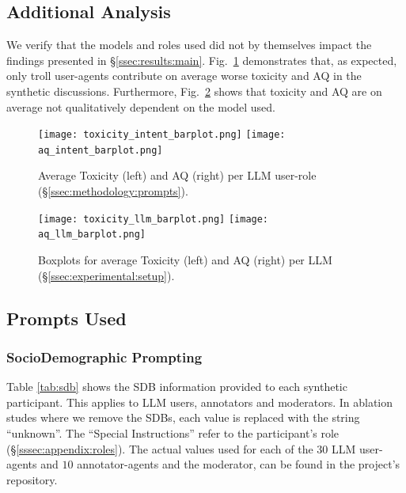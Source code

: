 \subsection{Additional Analysis}

We verify that the models and roles used did not by themselves impact the findings presented in \S\ref{ssec:results:main}. Fig.~\ref{fig:toxicity_aq_role} demonstrates that, as expected, only troll user-agents contribute on average worse toxicity and \ac{AQ} in the synthetic discussions. Furthermore, Fig.~\ref{fig:toxicity_aq_model} shows that toxicity and \ac{AQ} are on average not qualitatively dependent on the model used.

\begin{figure}
	\texttt{[image: toxicity\_intent\_barplot.png]} \hfill
	\texttt{[image: aq\_intent\_barplot.png]}
	\centering
	\caption{Average Toxicity (left) and \acf{AQ} (right) per \ac{LLM} user-role (\S\ref{ssec:methodology:prompts}).}
	\label{fig:toxicity_aq_role}
\end{figure}

\begin{figure}
	\texttt{[image: toxicity\_llm\_barplot.png]} \hfill
	\texttt{[image: aq\_llm\_barplot.png]}
	\centering
	\caption{Boxplots for average Toxicity (left) and \acf{AQ} (right) per \ac{LLM} (\S\ref{ssec:experimental:setup}).}
	\label{fig:toxicity_aq_model}
\end{figure}


\subsection{Prompts Used}
\label{ssec:appendix:prompts}


\subsubsection{SocioDemographic Prompting}
\label{sssec:appendix:sdbs}

Table \ref{tab:sdb} shows the \ac{SDB} information provided to each synthetic participant. This applies to \ac{LLM} users, annotators and moderators. In ablation studes where we remove the \acp{SDB}, each value is replaced with the string “unknown”. The “Special Instructions” refer to the participant's role (\S\ref{sssec:appendix:roles}). The actual values used for each of the $30$ \ac{LLM} user-agents and $10$ annotator-agents and the moderator, can be found in the project's repository\analysislink.

